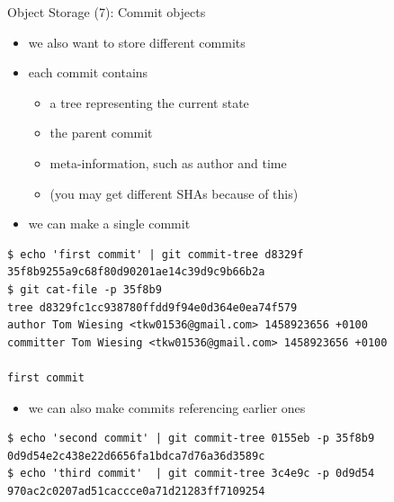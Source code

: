 \begin{frame}[fragile]{Object Storage (7): Commit objects}

  \begin{itemize}
    \item we also want to store different commits
    \item each commit contains
    \begin{itemize}
      \item a tree representing the current state
      \item the parent commit
      \item meta-information, such as author and time
      \item (you may get different SHAs because of this)
    \end{itemize}
  \end{itemize}

  \begin{itemize}
    \item we can make a single commit
  \end{itemize}
  
\begin{lstlisting}[style=ShellCmd]
$ echo 'first commit' | git commit-tree d8329f
35f8b9255a9c68f80d90201ae14c39d9c9b66b2a
$ git cat-file -p 35f8b9
tree d8329fc1cc938780ffdd9f94e0d364e0ea74f579
author Tom Wiesing <tkw01536@gmail.com> 1458923656 +0100
committer Tom Wiesing <tkw01536@gmail.com> 1458923656 +0100

first commit
\end{lstlisting}

\begin{itemize}
  \item we can also make commits referencing earlier ones
\end{itemize}

\begin{lstlisting}[style=ShellCmd]
$ echo 'second commit' | git commit-tree 0155eb -p 35f8b9
0d9d54e2c438e22d6656fa1bdca7d76a36d3589c
$ echo 'third commit'  | git commit-tree 3c4e9c -p 0d9d54
970ac2c0207ad51caccce0a71d21283ff7109254
\end{lstlisting}
\end{frame}

